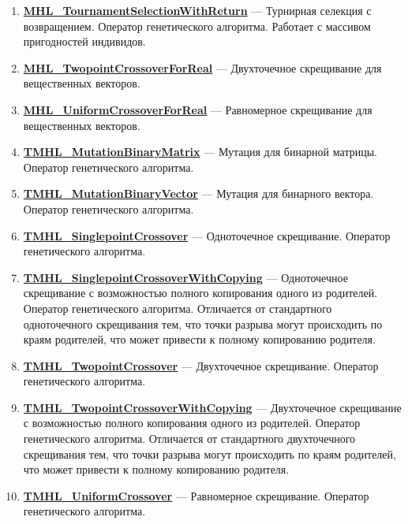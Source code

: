 \documentclass[a4paper,12pt]{article}
\begin{document}
\begin{enumerate}
\item \textbf{\hyperref[MHL_TournamentSelectionWithReturn]{MHL\_TournamentSelectionWithReturn}} --- Турнирная селекция с возвращением. Оператор генетического алгоритма. Работает с массивом пригодностей индивидов.

\item \textbf{\hyperref[MHL_TwopointCrossoverForReal]{MHL\_TwopointCrossoverForReal}} --- Двухточечное скрещивание для вещественных векторов.

\item \textbf{\hyperref[MHL_UniformCrossoverForReal]{MHL\_UniformCrossoverForReal}} --- Равномерное скрещивание для вещественных векторов.

\item \textbf{\hyperref[TMHL_MutationBinaryMatrix]{TMHL\_MutationBinaryMatrix}} --- Мутация для бинарной матрицы. Оператор генетического алгоритма.

\item \textbf{\hyperref[TMHL_MutationBinaryVector]{TMHL\_MutationBinaryVector}} --- Мутация для бинарного вектора. Оператор генетического алгоритма.

\item \textbf{\hyperref[TMHL_SinglepointCrossover]{TMHL\_SinglepointCrossover}} --- Одноточечное скрещивание. Оператор генетического алгоритма.

\item \textbf{\hyperref[TMHL_SinglepointCrossoverWithCopying]{TMHL\_SinglepointCrossoverWithCopying}} --- Одноточечное скрещивание с возможностью полного копирования одного из родителей. Оператор генетического алгоритма. Отличается от стандартного одноточечного скрещивания тем, что точки разрыва могут происходить по краям родителей, что может привести к полному копированию родителя.

\item \textbf{\hyperref[TMHL_TwopointCrossover]{TMHL\_TwopointCrossover}} --- Двухточечное скрещивание. Оператор генетического алгоритма.

\item \textbf{\hyperref[TMHL_TwopointCrossoverWithCopying]{TMHL\_TwopointCrossoverWithCopying}} --- Двухточечное скрещивание с возможностью полного копирования одного из родителей. Оператор генетического алгоритма. Отличается от стандартного двухточечного скрещивания тем, что точки разрыва могут происходить по краям родителей, что может привести к полному копированию родителя.

\item \textbf{\hyperref[TMHL_UniformCrossover]{TMHL\_UniformCrossover}} --- Равномерное скрещивание. Оператор генетического алгоритма.

\end{enumerate}
\end{document}
